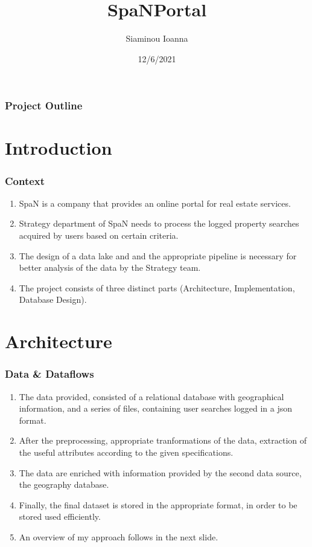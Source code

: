 \documentclass{beamer}
\title[Data Engineering assignment]{SpaNPortal}
\author{Siaminou Ioanna}
\date{12/6/2021}
\begin{document}
\frame{\titlepage}


\begin{frame}
\frametitle{Project Outline}
\tableofcontents
\end{frame}

\section{Introduction}
\begin{frame}
\frametitle{Context}
\begin{enumerate}
\item SpaN is a company that provides an online portal for real estate services.
\item Strategy department of SpaN needs to process the logged property searches acquired by users based on certain criteria.
\item The design of a data lake and and the appropriate pipeline is necessary for better analysis of the data by the Strategy team.
\item The project consists of three distinct parts (Architecture, Implementation, Database Design).
\end{enumerate}
\end{frame}

\section{Architecture}
\begin{frame}
\frametitle{Data \& Dataflows}
\begin{enumerate}
\item The data provided, consisted of a relational database with geographical information, and a series of files, containing user searches logged in a json format.
\item After the preprocessing, appropriate tranformations of the data, extraction of the useful attributes according to the given specifications.
\item The data are enriched with information provided by the second data source, the geography database.
\item Finally, the final dataset is stored in the appropriate format, in order to be stored used efficiently.
\item An overview of my approach follows in the next slide.
\end{enumerate}
\end{frame}
\end{document}
